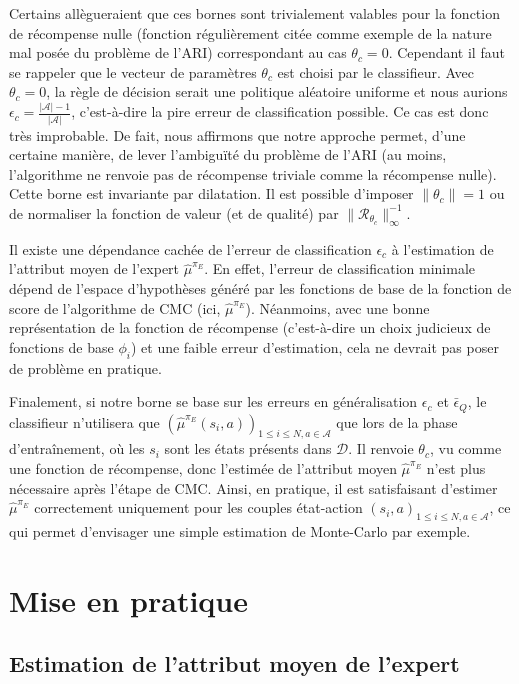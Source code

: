 \documentclass[english,utf8]{./hermes-journal}
\newcommand{\R}{\mathcal{R}}
\newcommand{\A}{\mathcal{A}}
\newcommand{\D}{\mathcal{D}}
\begin{document}
Certains allègueraient que ces bornes sont trivialement valables pour la fonction de récompense nulle (fonction régulièrement citée comme exemple de la nature mal posée du problème de l'ARI) correspondant au cas $\theta_c=0$. Cependant il faut se rappeler que le vecteur de paramètres $\theta_c$ est choisi par le classifieur. Avec 
$\theta_c=0$, la règle de décision serait une politique aléatoire uniforme et nous aurions $\epsilon_c = \frac{|\A|-1}{|\A|}$, c'est-à-dire la pire erreur de classification possible. Ce cas est donc très improbable. De fait, nous affirmons que notre approche permet, d'une certaine manière, de lever l'ambiguïté du problème de l'ARI (au moins, l'algorithme ne renvoie pas de récompense triviale comme la récompense nulle).
%
Cette borne est invariante par dilatation. Il est possible d'imposer 
$\|\theta_c\|=1$ ou de normaliser la fonction de valeur (et de qualité) par 
$\|\R_{\theta_c}\|_\infty^{-1}$.

Il existe une dépendance cachée de l'erreur de classification  $\epsilon_c$ à l'estimation de l'attribut moyen de l'expert  $\hat{\mu}^{\pi_E}$. En effet, l'erreur de classification minimale dépend de l'espace d'hypothèses généré par les fonctions de base de la fonction de score de l'algorithme de CMC (ici, 
$\hat{\mu}^{\pi_E}$). Néanmoins, avec une bonne représentation de la fonction de récompense (c'est-à-dire un choix judicieux de fonctions de base $\phi_i$) et une faible erreur d'estimation, cela ne devrait pas poser de problème en pratique.

Finalement, si notre borne se base sur les erreurs en généralisation 
$\epsilon_c$ et $\bar{\epsilon}_Q$, le classifieur n'utilisera que 
$(\hat{\mu}^{\pi_E}(s_i,a))_{1\leq i\leq N,a\in\A}$ que lors de la phase d'entraînement, où les $s_i$ sont les états présents dans $\D$. Il renvoie 
$\theta_c$, vu comme une fonction de récompense, donc l'estimée de l'attribut moyen $\hat{\mu}^{\pi_E}$ n'est plus nécessaire après l'étape de CMC. Ainsi, en pratique, il est satisfaisant d'estimer 
$\hat{\mu}^{\pi_E}$ correctement uniquement pour les couples état-action $(s_i,a)_{1\leq i\leq
N,a\in\A}$, ce qui permet d'envisager une simple estimation de Monte-Carlo par exemple.

\section{Mise en pratique}
\label{sec:practicalApproach}

\subsection{Estimation de l'attribut moyen de l'expert}
\label{subsec:practicalApproach:muE}
\end{document}

